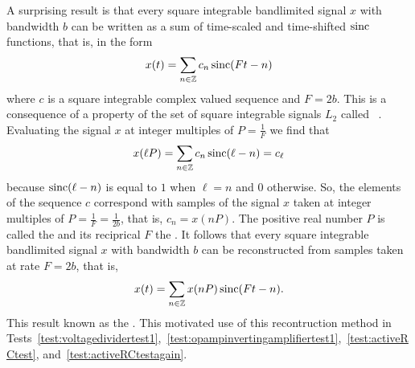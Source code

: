 A surprising result is that every square integrable bandlimited signal $x$ with bandwidth $b$ can be written as a sum of time-scaled and time-shifted $\operatorname{sinc}$ functions, that is, in the form
\begin{equation}\label{eq:sincinterformula}
 x(t) = \sum_{n \in {\mathbb Z}} c_n \operatorname{sinc}(F t - n)
 \end{equation}
where $c$ is a square integrable complex valued sequence and $F = 2b$.  This is a consequence of a property of the set of square integrable signals $L_2$ called ~\cite[Theorem~3.11 and page~91]{Rudin_real_and_complex_analysis}.  %
Evaluating the signal $x$ at integer multiples of $P = \tfrac{1}{F}$ we find that
\[
x(\ell P) = \sum_{n \in {\mathbb Z}} c_n \operatorname{sinc}( \ell - n ) = c_\ell
\]
because $\operatorname{sinc}( \ell - n)$ is equal to $1$ when $\ell = n$ and $0$ otherwise.  So, the elements of the sequence $c$ correspond with samples of the signal $x$ taken at integer multiples of $P = \tfrac{1}{F} = \tfrac{1}{2b}$, that is, $c_n = x(nP)$.  The positive real number $P$ is called the  and its reciprical $F$ the .  It follows that every square integrable bandlimited signal $x$ with bandwidth $b$ can be reconstructed from samples taken at rate $F = 2b$, that is,
\[
x(t) = \sum_{n \in {\mathbb Z}} x( n P ) \operatorname{sinc}(F t - n).
\]
This result known as the .  %
This motivated use of this recontruction method in Tests~\ref{test:voltagedividertest1},~\ref{test:opampinvertingamplifiertest1},~\ref{test:activeRCtest}, and~\ref{test:activeRCtestagain}.

